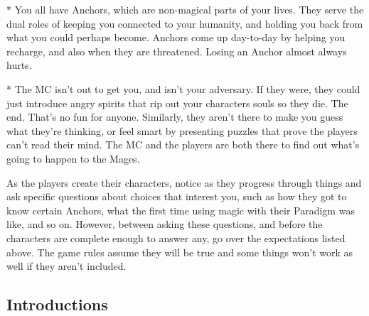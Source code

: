 \documentclass[
  oneside,
  statementpaper,
  9pt]{memoir}
\begin{document}
\begin{Player}
* You all have Anchors, which are non-magical parts of your lives. They serve the dual roles of keeping you connected to your humanity, and holding you back from what you could perhaps become. Anchors come up day-to-day by helping you recharge, and also when they are threatened. Losing an Anchor almost always hurts.

* The MC isn’t out to get you, and isn’t your adversary. If they were, they could just introduce angry spirits that rip out your characters souls so they die. The end. That’s no fun for anyone. Similarly, they aren’t there to make you guess what they’re thinking, or feel smart by presenting puzzles that prove the players can’t read their mind. The MC and the players are both there to find out what’s going to happen to the Mages.

\end{Player}

\begin{MC}

As the players create their characters, notice as they progress through things and ask specific questions about choices that interest you, such as how they got to know certain Anchors, what the first time using magic with their Paradigm was like, and so on. However, between asking these questions, and before the characters are complete enough to answer any, go over the expectations listed above. The game rules assume they will be true and some things won't work as well if they aren't included.

\end{MC}

\hypertarget{introductions}{%
\subsection{Introductions}\label{introductions}}
\end{document}
